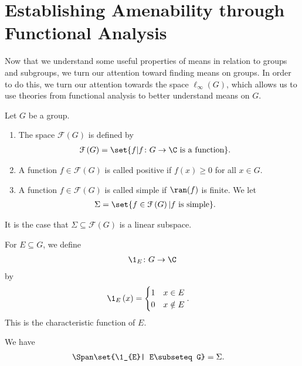 \section{Establishing Amenability through Functional Analysis}\label{sec:functional_analysis_and_amenability}%
Now that we understand some useful properties of means in relation to groups and subgroups, we turn our attention toward finding means on groups. In order to do this, we turn our attention towards the space $\ell_{\infty}\left(G\right)$, which allows us to use theories from functional analysis to better understand means on $G$.
\begin{definition}
  Let $G$ be a group.
  \begin{enumerate}[(1)]
    \item The space $\mathcal{F}\left(G\right)$ is defined by
      \begin{align*}
        \mathcal{F}\left(G\right) &= \set{f | f\colon G\rightarrow \C\text{ is a function}}.
      \end{align*}
    \item A function $f\in \mathcal{F}\left(G\right)$ is called positive if $f(x) \geq 0$ for all $x\in G$.
    \item A function $f\in \mathcal{F}\left(G\right)$ is called simple if $\ran(f)$ is finite. We let
      \begin{align*}
        \Sigma &= \set{f\in \mathcal{F}\left(G\right) | f\text{ is simple}}.
      \end{align*}
  \end{enumerate}
\end{definition}
\begin{fact}
  It is the case that $\Sigma \subseteq \mathcal{F}\left(G\right)$ is a linear subspace.
\end{fact}
\begin{definition}
  For $E\subseteq G$, we define
  \begin{align*}
    \1_{E}\colon G\rightarrow \C
  \end{align*}
  by
  \begin{align*}
    \1_{E}\left(x\right) &= \begin{cases}
      1 & x\in E\\
      0 & x\notin E
    \end{cases}.
  \end{align*}
  This is the characteristic function of $E$.
\end{definition}
\begin{fact}
  We have
  \begin{align*}
    \Span\set{\1_{E}| E\subseteq G} &= \Sigma.
  \end{align*}
\end{fact}
